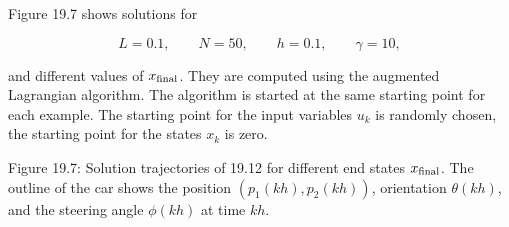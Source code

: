 Figure 19.7 shows solutions for

\[L=0.1,\qquad N=50,\qquad h=0.1,\qquad\gamma=10,\]

and different values of \(x_{\rm final}\). They are computed using the augmented Lagrangian algorithm. The algorithm is started at the same starting point for each example. The starting point for the input variables \(u_{k}\) is randomly chosen, the starting point for the states \(x_{k}\) is zero.

Figure 19.7: Solution trajectories of 19.12 for different end states \(x_{\rm final}\). The outline of the car shows the position \((p_{1}(kh),p_{2}(kh))\), orientation \(\theta(kh)\), and the steering angle \(\phi(kh)\) at time \(kh\).

 